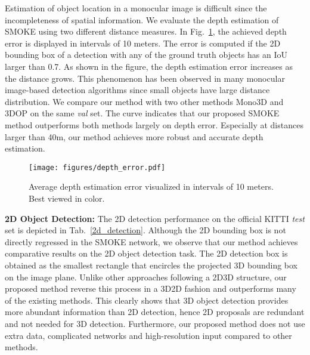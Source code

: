 \documentclass[10pt,twocolumn,letterpaper]{article}
\renewcommand{\paragraph}[1]{

        \vspace{3pt}
	\noindent\textbf{#1}}
\begin{document}
    
    Estimation of object location in a monocular image is difficult since the incompleteness of spatial information. We evaluate the depth estimation of SMOKE using two different distance measures. In Fig.~\ref{depth_error}, the achieved depth error is displayed in intervals of 10 meters. The error is computed if the 2D bounding box of a detection with any of the ground truth objects has an IoU larger than 0.7. As shown in the figure, the depth estimation error increases as the distance grows. This phenomenon has been observed in many monocular image-based detection algorithms since small objects have large distance distribution. We compare our method with two other methods Mono3D \cite{mono3d_2016} and 3DOP \cite{3dop_2015} on the same \textit{val} set. The curve indicates that our proposed SMOKE method outperforms both methods largely on depth error. Especially at distances larger than 40m, our method achieves more robust and accurate depth estimation.
    
    \begin{figure}
    \centering
        \vspace{-2em}
        \texttt{[image: figures/depth\_error.pdf]}
       \caption{Average depth estimation error visualized in intervals of 10 meters. Best viewed in color.}
        \label{depth_error} \vspace{-3mm}
    \end{figure}
    
    \paragraph{2D Object Detection:} 
    The 2D detection performance on the official KITTI \textit{test} set is depicted in Tab.~\ref{2d_detection}. Although the 2D bounding box is not directly regressed in the SMOKE network, we observe that our method achieves comparative results on the 2D object detection task. The 2D detection box is obtained as the smallest rectangle that encircles the projected 3D bounding box on the image plane. Unlike other approaches following a 2D3D structure, our proposed method reverse this process in a 3D2D fashion and outperforms many of the existing methods. This clearly shows that 3D object detection provides more abundant information than 2D detection, hence 2D proposals are redundant and not needed for 3D detection. Furthermore, our proposed method does not use extra data, complicated networks and high-resolution input compared to other methods.
    
\end{document}
